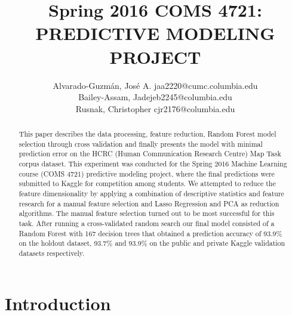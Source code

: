 \documentclass[twoside,11pt]{article}
\begin{document}
\title{Spring 2016 COMS 4721: PREDICTIVE MODELING PROJECT}

\author{\name Alvarado-Guzm\'an, Jos\'e A.  \email jaa2220@cumc.columbia.edu \\
       \name Bailey-Assam, Jade\email jeb2245@columbia.edu \\
       \name Rusnak, Christopher  \email cjr2176@columbia.edu \\
      }


\maketitle

\begin{abstract}%
This paper describes the data processing, feature reduction, Random Forest model selection through cross validation and finally presents the model with minimal prediction error on the HCRC (Human Communication Research Centre) Map Task corpus dataset. This experiment was conducted for the Spring 2016 Machine Learning course (COMS 4721) predictive modeling project, where the final predictions were submitted to Kaggle for competition among students. 
We attempted to reduce the feature dimensionality by applying a combination of descriptive statistics and feature research for a manual feature selection and Lasso Regression and PCA  as reduction algorithms. The manual feature selection turned out to be most successful for this task. After running a cross-validated random search our final model consisted of a Random Forest with 167 decision trees that obtained a prediction accuracy of 93.9\% on the holdout dataset, 93.7\% and 93.9\% on the public and private Kaggle validation datasets respectively.
\end{abstract}


\section{Introduction}
\end{document}
